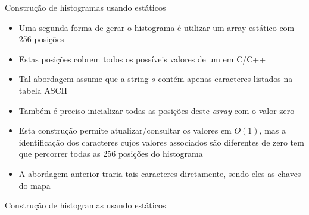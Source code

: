 \begin{frame}[fragile]{Construção de histogramas usando  estáticos}

    \begin{itemize}
        \item Uma segunda forma de gerar o histograma é utilizar um array estático com 256 posições

        \item Estas posições cobrem todos os possíveis valores de um  em C/C++

        \item Tal abordagem assume que a string $s$ contém apenas caracteres listados na tabela
            ASCII

        \item Também é preciso inicializar todas as posições deste \textit{array} com o valor
            zero

        \item Esta construção permite atualizar/consultar os valores em $O(1)$, mas a 
            identificação dos caracteres cujos valores associados são diferentes de zero tem
            que percorrer todas as 256 posições do histograma 

        \item A abordagem anterior traria tais caracteres diretamente, sendo eles as chaves do mapa
    \end{itemize}

\end{frame}

\begin{frame}[fragile]{Construção de histogramas usando  estáticos}
\end{frame}

